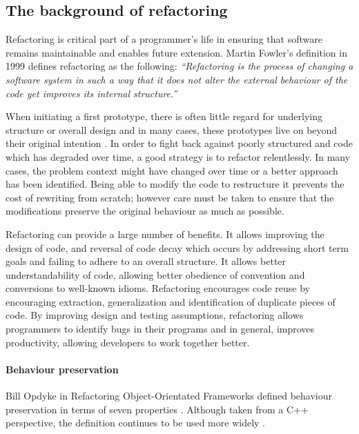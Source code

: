\subsection{The background of refactoring}\label{S:refactorback}
Refactoring is critical part of a programmer's life in ensuring that software remains maintainable and enables future extension. Martin Fowler's definition in 1999 \cite{fowler99} defines refactoring as the following: \emph{``Refactoring is the process of changing a software system in such a way that it does not alter the external behaviour of the code yet improves its internal structure.''}

When initiating a first prototype, there is often little regard for underlying structure or overall design and in many cases, these prototypes live on beyond their original intention \cite{foote1997big}. In order to fight back against poorly structured and code which has degraded over time, a good strategy is to refactor relentlessly. In many cases, the problem context might have changed over time or a better approach has been identified. Being able to modify the code to restructure it prevents the cost of rewriting from scratch; however care must be taken to ensure that the modifications preserve the original behaviour as much as possible.

Refactoring can provide a large number of benefits. It allows improving the design of code, and reversal of code decay which occurs by addressing short term goals and failing to adhere to an overall structure. It allows better understandability of code, allowing better obedience of convention and conversions to well-known idioms. Refactoring encourages code reuse by encouraging extraction, generalization and identification of duplicate pieces of code. By improving design and testing assumptions, refactoring allows programmers to identify bugs in their programs and in general, improves productivity, allowing developers to work together better.

\paragraph{Behaviour preservation}
Bill Opdyke in Refactoring Object-Orientated Frameworks defined behaviour preservation in terms of seven properties \cite{opdyke1992refactoring}. Although taken from a C++ perspective, the definition continues to be used more widely \cite{schafer2010specification}.

